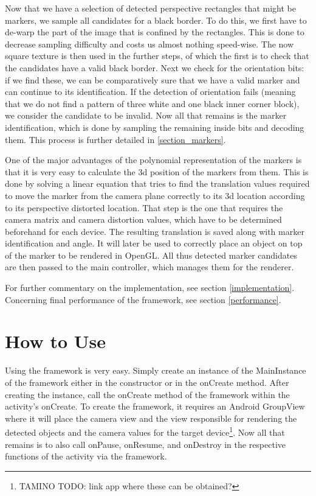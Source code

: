 Now that we have a selection of detected perspective rectangles that might be markers, we sample all candidates for a black border.
To do this, we first have to de-warp the part of the image that is confined by the rectangles.
This is done to decrease sampling difficulty and costs us almost nothing speed-wise.
The now square texture is then used in the further steps, of which the first is to check that the candidates have a valid black border.
Next we check for the orientation bits: if we find these, we can be comparatively sure that we have a valid marker and can continue to its identification.
If the detection of orientation fails (meaning that we do not find a pattern of three white and one black inner corner block), we consider the candidate to be invalid.
Now all that remains is the marker identification, which is done by sampling the remaining inside bits and decoding them.
This process is further detailed in \ref{section_markers}.

One of the major advantages of the polynomial representation of the markers is that it is very easy to calculate the 3d position of the markers from them.
This is done by solving a linear equation that tries to find the translation values required to move the marker from the camera plane correctly to its 3d location according to its perspective distorted location.
That step is the one that requires the camera matrix and camera distortion values, which have to be determined beforehand for each device.
The resulting translation is saved along with marker identification and angle.
It will later be used to correctly place an object on top of the marker to be rendered in OpenGL.
All thus detected marker candidates are then passed to the main controller, which manages them for the renderer.

For further commentary on the implementation, see section \ref{implementation}.
Concerning final performance of the framework, see section \ref{performance}.

\section{How to Use}

Using the framework is very easy.
Simply create an instance of the MainInstance of the framework either in the constructor or in the onCreate method.
After creating the instance, call the onCreate method of the framework within the activity's onCreate.
To create the framework, it requires an Android GroupView where it will place the camera view and the view responsible for rendering the detected objects and the camera values for the target device\footnote{TAMINO TODO: link app where these can be obtained?}.
Now all that remains is to also call onPause, onResume, and onDestroy in the respective functions of the activity via the framework.

